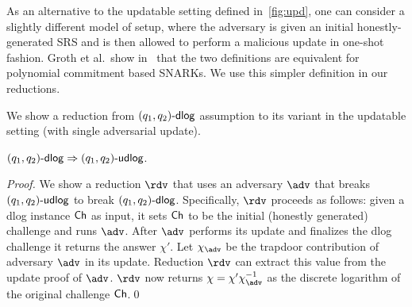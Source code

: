 \begin{remark}\label{rem:upd}
	As an alternative to the updatable setting defined in~\cref{fig:upd}, one can consider a slightly different model of setup, where the adversary is given an initial honestly-generated SRS and is then allowed to perform a malicious update in one-shot fashion.
	Groth
	et al.\ show in~\cite{C:GKMMM18} that the two definitions are equivalent for polynomial commitment based SNARKs. We use this simpler definition in our reductions.
\end{remark}


We show a reduction from $(q_1, q_2)\text{-}\mathsf{dlog}$ assumption to its variant in the updatable setting (with single adversarial update). 
\begin{lemma}
	$(q_1, q_2)\text{-}\mathsf{dlog} \Rightarrow (q_1, q_2)\text{-}\mathsf{udlog}$.
	\end{lemma}
\begin{proof}
	We show a reduction $\reduction$ that uses an adversary $\adv$ that breaks $(q_1, q_2)\text{-}\mathsf{udlog}$ to break $(q_1, q_2)\text{-}\mathsf{dlog}$. Specifically, $\reduction$ proceeds as follows: given a dlog instance $\mathsf{Ch}$ as input, it sets $\mathsf{Ch}$ to be the initial (honestly generated) challenge and runs $\adv$. After $\adv$ performs its update and finalizes the dlog challenge it returns the answer $\chi'$. Let $\chi_\adv$ be the trapdoor contribution of adversary $\adv$ in its update. Reduction $\reduction$ can extract this value from the update proof of $\adv$. $\reduction$ now returns $\chi = \chi' \chi_\adv^{-1}$ as the discrete logarithm of the original challenge $\mathsf{Ch}$.\qed
	\end{proof}


